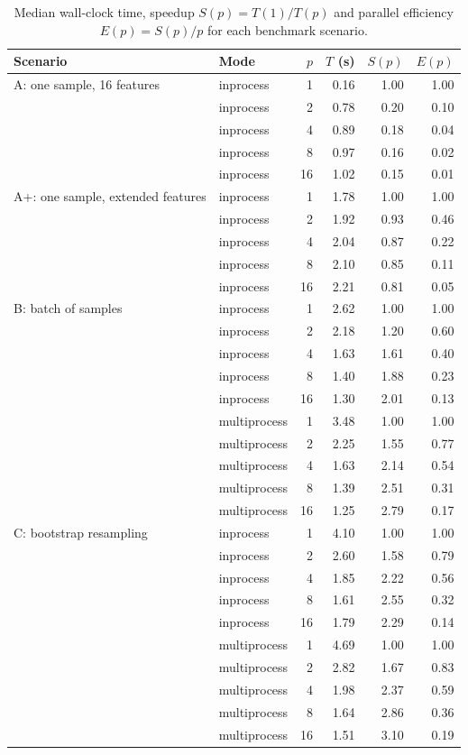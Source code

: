 \begin{table}[htbp]
\centering
\caption{Median wall-clock time, speedup $S(p)=T(1)/T(p)$ and parallel efficiency $E(p)=S(p)/p$ for each benchmark scenario.}
\label{tab:benchmark}
\begin{tabular}{llrrrr}
\toprule
Scenario & Mode & $p$ & $T$ (s) & $S(p)$ & $E(p)$ \\
\midrule
A: one sample, 16 features & inprocess & 1 & 0.16 & 1.00 & 1.00 \\
 & inprocess & 2 & 0.78 & 0.20 & 0.10 \\
 & inprocess & 4 & 0.89 & 0.18 & 0.04 \\
 & inprocess & 8 & 0.97 & 0.16 & 0.02 \\
 & inprocess & 16 & 1.02 & 0.15 & 0.01 \\
A+: one sample, extended features & inprocess & 1 & 1.78 & 1.00 & 1.00 \\
 & inprocess & 2 & 1.92 & 0.93 & 0.46 \\
 & inprocess & 4 & 2.04 & 0.87 & 0.22 \\
 & inprocess & 8 & 2.10 & 0.85 & 0.11 \\
 & inprocess & 16 & 2.21 & 0.81 & 0.05 \\
B: batch of samples & inprocess & 1 & 2.62 & 1.00 & 1.00 \\
 & inprocess & 2 & 2.18 & 1.20 & 0.60 \\
 & inprocess & 4 & 1.63 & 1.61 & 0.40 \\
 & inprocess & 8 & 1.40 & 1.88 & 0.23 \\
 & inprocess & 16 & 1.30 & 2.01 & 0.13 \\
 & multiprocess & 1 & 3.48 & 1.00 & 1.00 \\
 & multiprocess & 2 & 2.25 & 1.55 & 0.77 \\
 & multiprocess & 4 & 1.63 & 2.14 & 0.54 \\
 & multiprocess & 8 & 1.39 & 2.51 & 0.31 \\
 & multiprocess & 16 & 1.25 & 2.79 & 0.17 \\
C: bootstrap resampling & inprocess & 1 & 4.10 & 1.00 & 1.00 \\
 & inprocess & 2 & 2.60 & 1.58 & 0.79 \\
 & inprocess & 4 & 1.85 & 2.22 & 0.56 \\
 & inprocess & 8 & 1.61 & 2.55 & 0.32 \\
 & inprocess & 16 & 1.79 & 2.29 & 0.14 \\
 & multiprocess & 1 & 4.69 & 1.00 & 1.00 \\
 & multiprocess & 2 & 2.82 & 1.67 & 0.83 \\
 & multiprocess & 4 & 1.98 & 2.37 & 0.59 \\
 & multiprocess & 8 & 1.64 & 2.86 & 0.36 \\
 & multiprocess & 16 & 1.51 & 3.10 & 0.19 \\
\bottomrule
\end{tabular}
\end{table}
